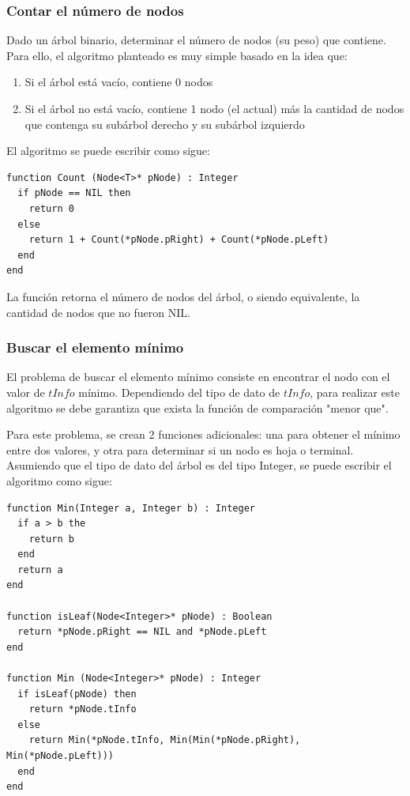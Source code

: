 \subsubsection{Contar el número de nodos}

Dado un árbol binario, determinar el número de nodos (su peso) que contiene. Para ello, el algoritmo planteado es muy simple basado en la idea que:
\begin{enumerate}
\item Si el árbol está vacío, contiene 0 nodos
\item Si el árbol no está vacío, contiene 1 nodo (el actual) más la cantidad de nodos que contenga su subárbol derecho y su subárbol izquierdo
\end{enumerate}

El algoritmo se puede escribir como sigue:

\begin{lstlisting}[upquote=true, language=pseudo]
function Count (Node<T>* pNode) : Integer
  if pNode == NIL then
    return 0
  else
    return 1 + Count(*pNode.pRight) + Count(*pNode.pLeft)
  end
end
\end{lstlisting}

La función retorna el número de nodos del árbol, o siendo equivalente, la cantidad de nodos que no fueron NIL.


\subsubsection{Buscar el elemento mínimo}

El problema de buscar el elemento mínimo consiste en encontrar el nodo con el valor de $tInfo$ mínimo. Dependiendo del tipo de dato de $tInfo$, para realizar este algoritmo se debe garantiza que exista la función de comparación "menor que".

Para este problema, se crean 2 funciones adicionales: una para obtener el mínimo entre dos valores, y otra para determinar si un nodo es hoja o terminal. Asumiendo que el tipo de dato del árbol es del tipo Integer, se puede escribir el algoritmo como sigue:

\begin{lstlisting}[upquote=true, language=pseudo]
function Min(Integer a, Integer b) : Integer
  if a > b the
    return b
  end
  return a
end

function isLeaf(Node<Integer>* pNode) : Boolean
  return *pNode.pRight == NIL and *pNode.pLeft
end

function Min (Node<Integer>* pNode) : Integer
  if isLeaf(pNode) then
    return *pNode.tInfo
  else
    return Min(*pNode.tInfo, Min(Min(*pNode.pRight), Min(*pNode.pLeft)))
  end
end
\end{lstlisting}

